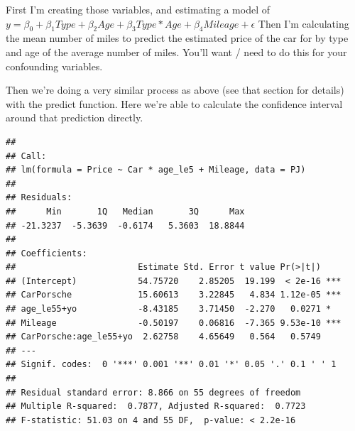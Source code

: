 \documentclass[]{article}
\newenvironment{Shaded}{\begin{snugshade}}{\end{snugshade}}
\newcommand{\DataTypeTok}[1]{\textcolor[rgb]{0.13,0.29,0.53}{#1}}
\newcommand{\DecValTok}[1]{\textcolor[rgb]{0.00,0.00,0.81}{#1}}
\newcommand{\KeywordTok}[1]{\textcolor[rgb]{0.13,0.29,0.53}{\textbf{#1}}}
\newcommand{\NormalTok}[1]{#1}
\newcommand{\OperatorTok}[1]{\textcolor[rgb]{0.81,0.36,0.00}{\textbf{#1}}}
\newcommand{\OtherTok}[1]{\textcolor[rgb]{0.56,0.35,0.01}{#1}}
\newcommand{\StringTok}[1]{\textcolor[rgb]{0.31,0.60,0.02}{#1}}
\begin{document}
First I'm creating those variables, and estimating a model of
\(y = \beta_0+\beta_1 Type + \beta_2 Age + \beta_3 Type*Age + \beta_4 Mileage + \epsilon\)
Then I'm calculating the mean number of miles to predict the estimated
price of the car for by type and age of the average number of miles.
You'll want / need to do this for your confounding variables.

Then we're doing a very similar process as above (see that section for
details) with the predict function. Here we're able to calculate the
confidence interval around that prediction directly.

\begin{Shaded}
\end{Shaded}

\begin{verbatim}
## 
## Call:
## lm(formula = Price ~ Car * age_le5 + Mileage, data = PJ)
## 
## Residuals:
##      Min       1Q   Median       3Q      Max 
## -21.3237  -5.3639  -0.6174   5.3603  18.8844 
## 
## Coefficients:
##                        Estimate Std. Error t value Pr(>|t|)    
## (Intercept)            54.75720    2.85205  19.199  < 2e-16 ***
## CarPorsche             15.60613    3.22845   4.834 1.12e-05 ***
## age_le55+yo            -8.43185    3.71450  -2.270   0.0271 *  
## Mileage                -0.50197    0.06816  -7.365 9.53e-10 ***
## CarPorsche:age_le55+yo  2.62758    4.65649   0.564   0.5749    
## ---
## Signif. codes:  0 '***' 0.001 '**' 0.01 '*' 0.05 '.' 0.1 ' ' 1
## 
## Residual standard error: 8.866 on 55 degrees of freedom
## Multiple R-squared:  0.7877, Adjusted R-squared:  0.7723 
## F-statistic: 51.03 on 4 and 55 DF,  p-value: < 2.2e-16
\end{verbatim}
\end{document}
